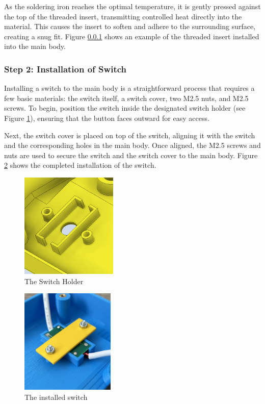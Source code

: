 As the soldering iron reaches the optimal temperature, it is gently pressed against the top of the threaded insert, transmitting controlled heat directly into the material. This causes the insert to soften and adhere to the surrounding surface, creating a snug fit. Figure \ref{} shows an example of the threaded insert installed into the main body.

\subsubsection{Step 2: Installation of Switch}

Installing a switch to the main body is a straightforward process that requires a few basic materials: the switch itself, a switch cover, two M2.5 nuts, and M2.5 screws. To begin, position the switch inside the designated switch holder (see Figure \ref{fig:switchholder}), ensuring that the button faces outward for easy access.

Next, the switch cover is placed on top of the switch, aligning it with the switch and the corresponding holes in the main body. Once aligned, the M2.5 screws and nuts are used to secure the switch and the switch cover to the main body. Figure \ref{fig:switchinstall} shows the completed installation of the switch.

\begin{figure}
    \centering
    \includegraphics[height=5cm]{texs/Part1/chapter5/image/switchhole.png}
    \caption{The Switch Holder}
    \label{fig:switchholder}
\end{figure}

\begin{figure}
    \centering
    \includegraphics[height=5cm]{texs/Part1/chapter5/image/switchinstall.jpg}
    \caption{The installed switch}
    \label{fig:switchinstall}
\end{figure}


